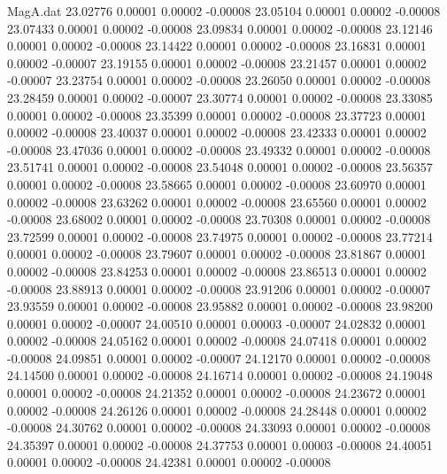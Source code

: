 \begin{filecontents}{MagA.dat}
  23.02776    0.00001    0.00002   -0.00008
  23.05104    0.00001    0.00002   -0.00008
  23.07433    0.00001    0.00002   -0.00008
  23.09834    0.00001    0.00002   -0.00008
  23.12146    0.00001    0.00002   -0.00008
  23.14422    0.00001    0.00002   -0.00008
  23.16831    0.00001    0.00002   -0.00007
  23.19155    0.00001    0.00002   -0.00008
  23.21457    0.00001    0.00002   -0.00007
  23.23754    0.00001    0.00002   -0.00008
  23.26050    0.00001    0.00002   -0.00008
  23.28459    0.00001    0.00002   -0.00007
  23.30774    0.00001    0.00002   -0.00008
  23.33085    0.00001    0.00002   -0.00008
  23.35399    0.00001    0.00002   -0.00008
  23.37723    0.00001    0.00002   -0.00008
  23.40037    0.00001    0.00002   -0.00008
  23.42333    0.00001    0.00002   -0.00008
  23.47036    0.00001    0.00002   -0.00008
  23.49332    0.00001    0.00002   -0.00008
  23.51741    0.00001    0.00002   -0.00008
  23.54048    0.00001    0.00002   -0.00008
  23.56357    0.00001    0.00002   -0.00008
  23.58665    0.00001    0.00002   -0.00008
  23.60970    0.00001    0.00002   -0.00008
  23.63262    0.00001    0.00002   -0.00008
  23.65560    0.00001    0.00002   -0.00008
  23.68002    0.00001    0.00002   -0.00008
  23.70308    0.00001    0.00002   -0.00008
  23.72599    0.00001    0.00002   -0.00008
  23.74975    0.00001    0.00002   -0.00008
  23.77214    0.00001    0.00002   -0.00008
  23.79607    0.00001    0.00002   -0.00008
  23.81867    0.00001    0.00002   -0.00008
  23.84253    0.00001    0.00002   -0.00008
  23.86513    0.00001    0.00002   -0.00008
  23.88913    0.00001    0.00002   -0.00008
  23.91206    0.00001    0.00002   -0.00007
  23.93559    0.00001    0.00002   -0.00008
  23.95882    0.00001    0.00002   -0.00008
  23.98200    0.00001    0.00002   -0.00007
  24.00510    0.00001    0.00003   -0.00007
  24.02832    0.00001    0.00002   -0.00008
  24.05162    0.00001    0.00002   -0.00008
  24.07418    0.00001    0.00002   -0.00008
  24.09851    0.00001    0.00002   -0.00007
  24.12170    0.00001    0.00002   -0.00008
  24.14500    0.00001    0.00002   -0.00008
  24.16714    0.00001    0.00002   -0.00008
  24.19048    0.00001    0.00002   -0.00008
  24.21352    0.00001    0.00002   -0.00008
  24.23672    0.00001    0.00002   -0.00008
  24.26126    0.00001    0.00002   -0.00008
  24.28448    0.00001    0.00002   -0.00008
  24.30762    0.00001    0.00002   -0.00008
  24.33093    0.00001    0.00002   -0.00008
  24.35397    0.00001    0.00002   -0.00008
  24.37753    0.00001    0.00003   -0.00008
  24.40051    0.00001    0.00002   -0.00008
  24.42381    0.00001    0.00002   -0.00008

\end{filecontents}
